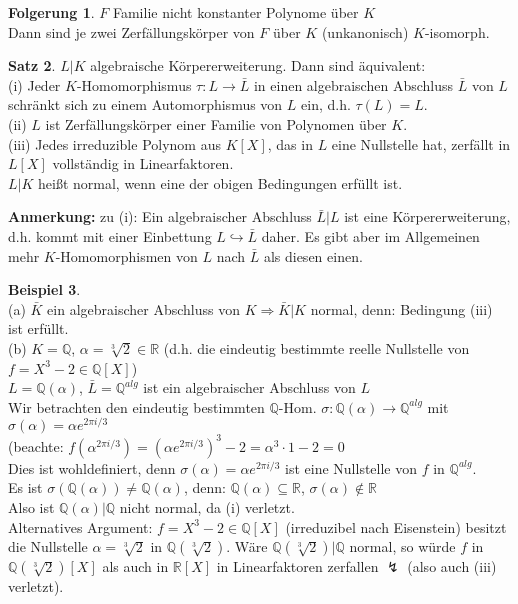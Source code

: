 \documentclass[10pt,a4paper,numbers=endperiod]{scrreprt}
\theoremstyle{definition}
\newtheorem{satz}{Satz}[section]
\newtheorem{bsp}[satz]{Beispiel}
\newtheorem{folg}[satz]{Folgerung}
\def\QQ{{\mathbb Q}}
\def\RR{{\mathbb R}}
\begin{document}
\begin{folg}
	$F$ Familie nicht konstanter Polynome über $K$\\
	Dann sind je zwei Zerfällungskörper von $F$ über $K$ (unkanonisch) $K$-isomorph.
\end{folg}

\begin{satz}
	$L|K$ algebraische Körpererweiterung. Dann sind äquivalent:\\
	(i) Jeder $K$-Homomorphismus $\tau: L \rightarrow \bar{L}$ in einen algebraischen Abschluss $\bar{L}$ von $L$ schränkt sich zu einem Automorphismus von $L$ ein, d.h. $\tau(L) = L$.\\
	(ii) $L$ ist Zerfällungskörper einer Familie von Polynomen über $K$.\\
	(iii) Jedes irreduzible Polynom aus $K[X]$, das in $L$ eine Nullstelle hat, zerfällt in $L[X]$ vollständig in Linearfaktoren.\\
	$L|K$ heißt normal, wenn eine der obigen Bedingungen erfüllt ist.
\end{satz}

\textbf{Anmerkung:} zu (i): Ein algebraischer Abschluss $\bar{L}|L$ ist eine Körpererweiterung, d.h. kommt mit einer Einbettung $L \hookrightarrow \bar{L}$ daher. Es gibt aber im Allgemeinen mehr $K$-Homomorphismen von $L$ nach $\bar{L}$ als diesen einen.

\begin{bsp}
	$ $\\
	(a) $\bar{K}$ ein algebraischer Abschluss von $K \Rightarrow \bar{K}|K$ normal, denn: Bedingung (iii) ist erfüllt.\\
	(b) $K = \QQ$, $\alpha = \sqrt[3]{2} \in \RR$ (d.h. die eindeutig bestimmte reelle Nullstelle von $f= X^3 -2 \in \QQ[X]$)\\
	$L = \QQ(\alpha)$, $\bar{L} = \QQ^{alg}$ ist ein algebraischer Abschluss von $L$\\
	Wir betrachten den eindeutig bestimmten $\QQ$-Hom. $\sigma: \QQ(\alpha) \rightarrow \QQ^{alg}$ mit $\sigma(\alpha) = \alpha e^{2\pi i/3}$\\
	(beachte: $f(\alpha^{2 \pi i/3}) = (\alpha e^{2 \pi i/3})^3 -2 = \alpha^3 \cdot 1 - 2 = 0$\\
	Dies ist wohldefiniert, denn $\sigma(\alpha) = \alpha e^{2 \pi i/3}$ ist eine Nullstelle von $f$ in $\QQ^{alg}$.\\
	Es ist $\sigma(\QQ(\alpha)) \neq \QQ(\alpha)$, denn: $\QQ(\alpha) \subseteq \RR$, $\sigma(\alpha) \notin  \RR$\\
	Also ist $\QQ(\alpha)| \QQ$ nicht normal, da (i) verletzt.\\
	Alternatives Argument: $f = X^3 -2 \in \QQ[X]$ (irreduzibel nach Eisenstein) besitzt die Nullstelle $\alpha = \sqrt[3]{2}$ in $\QQ(\sqrt[3]{2})$. Wäre $\QQ(\sqrt[3]{2})|\QQ$ normal, so würde $f$ in $\QQ(\sqrt[3]{2})[X]$ als auch in $\RR[X]$ in Linearfaktoren zerfallen $\lightning$ (also auch (iii) verletzt).
\end{bsp}
\end{document}
